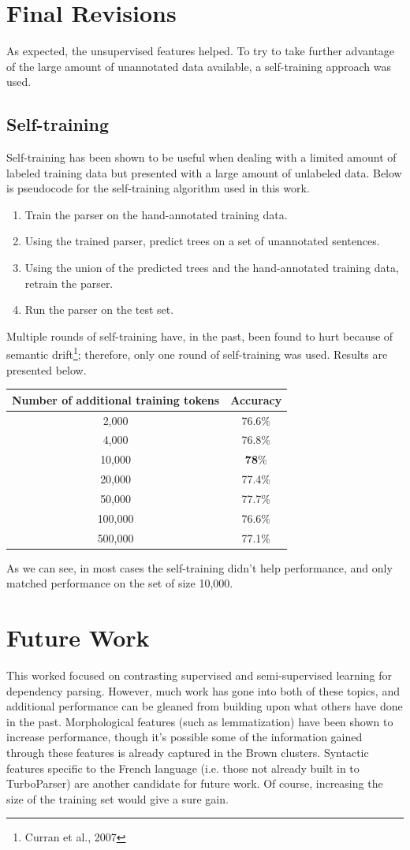 \documentclass[11pt,letterpaper]{article}
\begin{document}
\section{Final Revisions}
As expected, the unsupervised features helped. To try to take further advantage of the large amount of unannotated data available, a self-training approach was used. 
\subsection{Self-training}
Self-training has been shown to be useful when dealing with a limited amount of labeled training data but presented with a large amount of unlabeled data. Below is pseudocode for the self-training algorithm used in this work.
\begin{enumerate}
\item Train the parser on the hand-annotated training data.
\item Using the trained parser, predict trees on a set of unannotated sentences. 
\item Using the union of the predicted trees and the hand-annotated training data, retrain the parser.
\item Run the parser on the test set.
\end{enumerate}
Multiple rounds of self-training have, in the past, been found to hurt because of semantic drift\footnote{Curran et al.,
2007}; therefore, only one round of self-training was used. Results are presented below. 
\begin{center}
\begin{tabular}{|c|c|}
\hline
Number of additional training tokens & Accuracy\\
\hline
2,000 & 76.6\%\\
4,000 & 76.8\%\\
10,000 & \textbf{78}\%\\
20,000 & 77.4\%\\
50,000 & 77.7\%\\
100,000 & 76.6\%\\
500,000 & 77.1\%\\
\hline
\end{tabular}
\end{center}
As we can see, in most cases the self-training didn't help performance, and only matched performance on the set of size 10,000. 

\section{Future Work}
This worked focused on contrasting supervised and semi-supervised learning for dependency parsing. However, much work has gone into both of these topics, and additional performance can be gleaned from building upon what others have done in the past. Morphological features (such as lemmatization) have been shown to increase performance, though it's possible some of the information gained through these features is already captured in the Brown clusters. Syntactic features specific to the French language (i.e. those not already built in to TurboParser) are another candidate for future work. Of course, increasing the size of the training set would give a sure gain. 

\label{lastpage}
\end{document}
